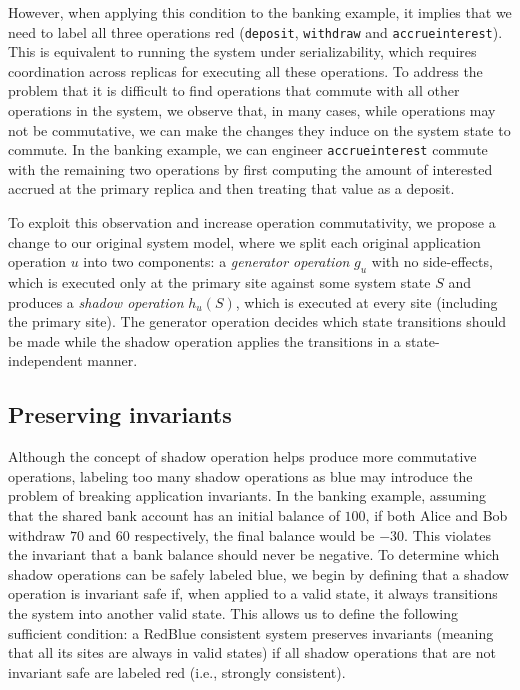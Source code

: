 \documentclass[11pt,dvipdfm]{article}
\begin{document}
However, when applying this condition to the banking example, it implies that we need to label all three operations red
({\tt deposit}, {\tt withdraw} and {\tt accrueinterest}).
This is equivalent to running the system under serializability, which requires coordination across replicas for executing all these operations.
To address the problem that it is difficult to find operations that commute with all other operations in the system, we observe that, in many cases,
while operations may not be commutative, we
can make the changes they induce on the system state to commute. In
the banking example, we can engineer {\tt accrueinterest} commute with the remaining two operations
by first computing the amount of interested accrued at the primary replica and then treating that value as a deposit.


To exploit this observation and increase operation commutativity, we propose a change to our
original system model,
where we split each original application operation $u$
into two components: a {\em generator operation} $g_u$ with no
side-effects, which is executed only at the primary site against some
system state $S$ and produces a {\em shadow operation} $h_u(S)$,
which is executed at every site (including the primary site). The
generator operation decides which state transitions should be made
while the shadow operation applies the transitions in a
state-indep\-endent manner.

\subsection{Preserving invariants}
Although the concept of shadow operation helps produce more commutative operations, labeling too many
shadow operations as blue may introduce the problem of breaking application invariants. In the banking example, assuming that the shared bank account has an initial balance of $100$, if both Alice and Bob withdraw $70$ and $60$ respectively,
the final balance would be $-30$. This violates the
invariant that a bank balance should never be negative. To determine which shadow
operations can be safely labeled blue, we begin by defining that a
shadow operation is invariant safe if, when applied to a valid state, it always transitions
the system into another valid state. This allows us to define the following
sufficient condition: a RedBlue consistent system preserves invariants (meaning that all its sites are always in valid states) if all shadow operations that are not invariant safe are labeled red (i.e., strongly consistent).
\end{document}
